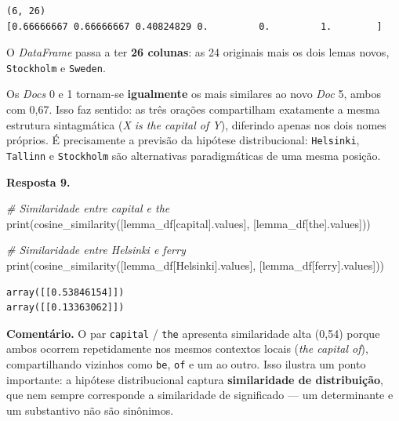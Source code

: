\documentclass[
  brazilian,
]{article}
\newenvironment{Shaded}{}{}
\newcommand{\BuiltInTok}[1]{#1}
\newcommand{\CommentTok}[1]{\textcolor[rgb]{0.38,0.63,0.69}{\textit{#1}}}
\newcommand{\NormalTok}[1]{#1}
\newcommand{\StringTok}[1]{\textcolor[rgb]{0.25,0.44,0.63}{#1}}
\begin{document}
\begin{verbatim}
(6, 26)
[0.66666667 0.66666667 0.40824829 0.         0.         1.        ]
\end{verbatim}

O \emph{DataFrame} passa a ter \textbf{26 colunas}: as 24 originais mais
os dois lemas novos, \texttt{Stockholm} e \texttt{Sweden}.

Os \emph{Docs} 0 e 1 tornam-se \textbf{igualmente} os mais similares ao
novo \emph{Doc} 5, ambos com 0,67. Isso faz sentido: as três orações
compartilham exatamente a mesma estrutura sintagmática (\emph{X is the
capital of Y}), diferindo apenas nos dois nomes próprios. É precisamente
a previsão da hipótese distribucional: \texttt{Helsinki},
\texttt{Tallinn} e \texttt{Stockholm} são alternativas paradigmáticas de
uma mesma posição.

\textbf{Resposta 9.}

\begin{Shaded}
\begin{Highlighting}[]
\CommentTok{\# Similaridade entre \textquotesingle{}capital\textquotesingle{} e \textquotesingle{}the\textquotesingle{}}
\BuiltInTok{print}\NormalTok{(cosine\_similarity([lemma\_df[}\StringTok{\textquotesingle{}capital\textquotesingle{}}\NormalTok{].values], [lemma\_df[}\StringTok{\textquotesingle{}the\textquotesingle{}}\NormalTok{].values]))}

\CommentTok{\# Similaridade entre \textquotesingle{}Helsinki\textquotesingle{} e \textquotesingle{}ferry\textquotesingle{}}
\BuiltInTok{print}\NormalTok{(cosine\_similarity([lemma\_df[}\StringTok{\textquotesingle{}Helsinki\textquotesingle{}}\NormalTok{].values], [lemma\_df[}\StringTok{\textquotesingle{}ferry\textquotesingle{}}\NormalTok{].values]))}
\end{Highlighting}
\end{Shaded}

\begin{verbatim}
array([[0.53846154]])
array([[0.13363062]])
\end{verbatim}

\textbf{Comentário.} O par \texttt{capital} / \texttt{the} apresenta
similaridade alta (0,54) porque ambos ocorrem repetidamente nos mesmos
contextos locais (\emph{the capital of}), compartilhando vizinhos como
\texttt{be}, \texttt{of} e um ao outro. Isso ilustra um ponto
importante: a hipótese distribucional captura \textbf{similaridade de
distribuição}, que nem sempre corresponde a similaridade de significado
--- um determinante e um substantivo não são sinônimos.
\end{document}
